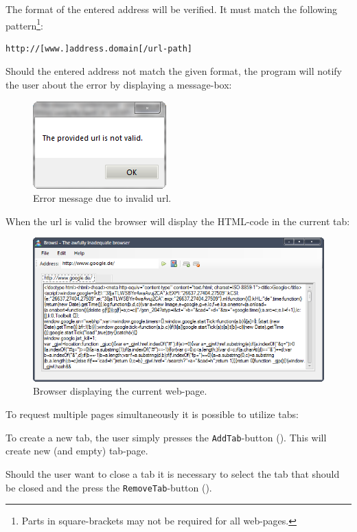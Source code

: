 The format of the entered address will be verified. It must match the following pattern\footnote{Parts in square-brackets may not be required for all web-pages.}:

\begin{lstlisting}[language=xml]
http://[www.]address.domain[/url-path]
\end{lstlisting}

Should the entered address not match the given format, the program will notify the user about the error by displaying a message-box:

\begin{figure}[H]
\begin{center}
\includegraphics[scale=1]{gfx/error_message.png}
\caption{Error message due to invalid url.}
\label{fig:error_message}
\end{center}
\end{figure}

When the url is valid the browser will display the \ac{HTML}-code in the current tab:

\begin{figure}[H]
\begin{center}
\includegraphics[width=\textwidth]{gfx/display_page.png}
\caption{Browser displaying the current web-page.}
\label{fig:display_page}
\end{center}
\end{figure}

To request multiple pages simultaneously it is possible to utilize tabs:

To create a new tab, the user simply presses the \texttt{AddTab}-button (). This will create new (and empty) tab-page.

Should the user want to close a tab it is necessary to select the tab that should be closed and the press the \texttt{RemoveTab}-button ().
